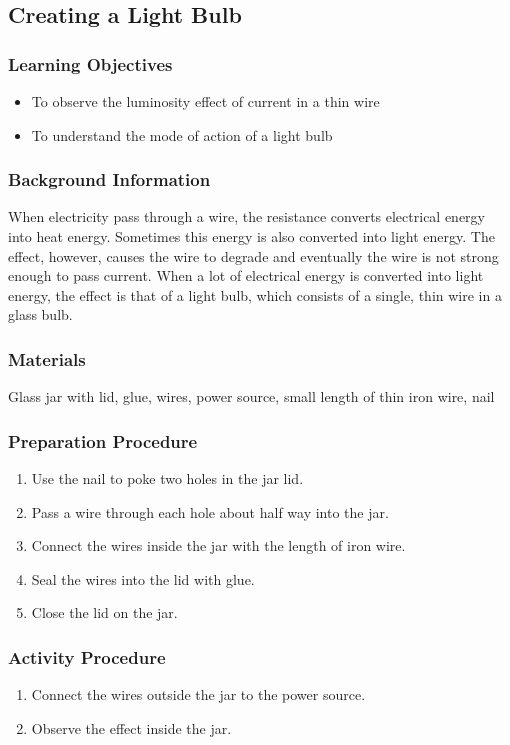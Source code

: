 \subsection{Creating a Light Bulb}

\subsubsection*{Learning Objectives}
\begin{itemize}
\item{To observe the luminosity effect of current in a thin wire}
\item{To understand the mode of action of a light bulb}
\end{itemize}

\subsubsection*{Background Information}
When electricity pass through a wire, the resistance converts electrical energy into heat energy.  Sometimes this energy is also converted into light energy.  The effect, however, causes the wire to degrade and eventually the wire is not strong enough to pass current.  When a lot of electrical energy is converted into light energy, the effect is that of a light bulb, which consists of a single, thin wire in a glass bulb.

\subsubsection*{Materials}
Glass jar with lid, glue, wires, power source, small length of thin iron wire, nail

\subsubsection*{Preparation Procedure}
\begin{enumerate}
\item{Use the nail to poke two holes in the jar lid.}
\item{Pass a wire through each hole about half way into the jar.}
\item{Connect the wires inside the jar with the length of iron wire.}
\item{Seal the wires into the lid with glue.}
\item{Close the lid on the jar.}
\end{enumerate}

\subsubsection*{Activity Procedure}
\begin{enumerate}
\item{Connect the wires outside the jar to the power source.}
\item{Observe the effect inside the jar.}
\end{enumerate}

